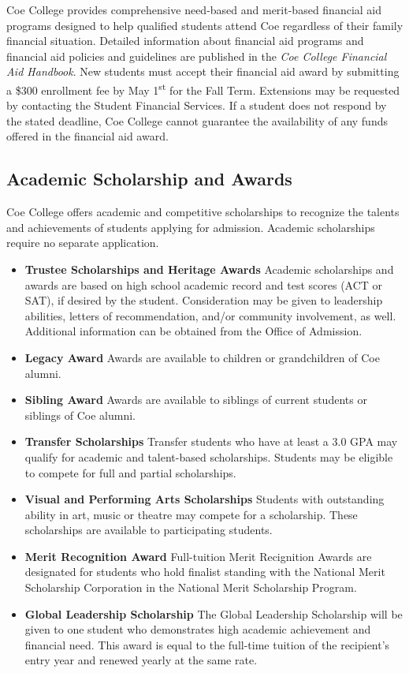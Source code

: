 \documentclass[
  letterpaper,
]{scrbook}
\providecommand{\tightlist}{%
  \setlength{\itemsep}{0pt}\setlength{\parskip}{0pt}}
\begin{document}
Coe College provides comprehensive need-based and merit-based financial
aid programs designed to help qualified students attend Coe regardless
of their family financial situation. Detailed information about
financial aid programs and financial aid policies and guidelines are
published in the \emph{Coe College Financial Aid Handbook}. New students
must accept their financial aid award by submitting a \$300 enrollment
fee by May 1\textsuperscript{st} for the Fall Term. Extensions may be
requested by contacting the Student Financial Services. If a student
does not respond by the stated deadline, Coe College cannot guarantee
the availability of any funds offered in the financial aid award.

\subsection{Academic Scholarship and
Awards}\label{academic-scholarship-and-awards}

Coe College offers academic and competitive scholarships to recognize
the talents and achievements of students applying for admission.
Academic scholarships require no separate application.

\begin{itemize}
\tightlist
\item
  \textbf{Trustee Scholarships and Heritage Awards} Academic
  scholarships and awards are based on high school academic record and
  test scores (ACT or SAT), if desired by the student. Consideration may
  be given to leadership abilities, letters of recommendation, and/or
  community involvement, as well. Additional information can be obtained
  from the Office of Admission.
\item
  \textbf{Legacy Award} Awards are available to children or
  grandchildren of Coe alumni.
\item
  \textbf{Sibling Award} Awards are available to siblings of current
  students or siblings of Coe alumni.
\item
  \textbf{Transfer Scholarships} Transfer students who have at least a
  3.0 GPA may qualify for academic and talent-based scholarships.
  Students may be eligible to compete for full and partial scholarships.
\item
  \textbf{Visual and Performing Arts Scholarships} Students with
  outstanding ability in art, music or theatre may compete for a
  scholarship. These scholarships are available to participating
  students.
\item
  \textbf{Merit Recognition Award} Full-tuition Merit Recignition Awards
  are designated for students who hold finalist standing with the
  National Merit Scholarship Corporation in the National Merit
  Scholarship Program.
\item
  \textbf{Global Leadership Scholarship} The Global Leadership
  Scholarship will be given to one student who demonstrates high
  academic achievement and financial need. This award is equal to the
  full-time tuition of the recipient's entry year and renewed yearly at
  the same rate.
\end{itemize}
\end{document}
